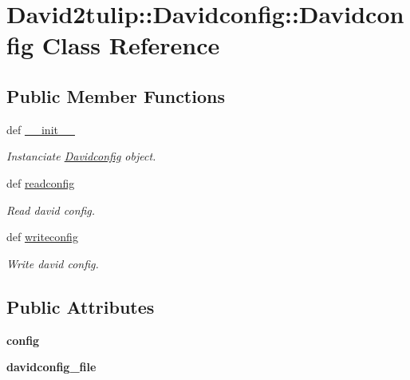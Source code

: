 \hypertarget{classDavid2tulip_1_1Davidconfig_1_1Davidconfig}{
\section{\-David2tulip\-:\-:\-Davidconfig\-:\-:\-Davidconfig \-Class \-Reference}
\label{classDavid2tulip_1_1Davidconfig_1_1Davidconfig}
}
\subsection*{\-Public \-Member \-Functions}
\begin{DoxyCompactItemize}
\item 
def \hyperlink{classDavid2tulip_1_1Davidconfig_1_1Davidconfig_ab54dbe407ba00db2ced4a7ff30ca144b}{\-\_\-\-\_\-init\-\_\-\-\_\-}
\begin{DoxyCompactList}\small\item\em \-Instanciate \hyperlink{classDavid2tulip_1_1Davidconfig_1_1Davidconfig}{\-Davidconfig} object. \end{DoxyCompactList}\item 
def \hyperlink{classDavid2tulip_1_1Davidconfig_1_1Davidconfig_ae745096fe43e4e5dfec64b0e6962d592}{readconfig}
\begin{DoxyCompactList}\small\item\em \-Read david config. \end{DoxyCompactList}\item 
\hypertarget{classDavid2tulip_1_1Davidconfig_1_1Davidconfig_a514860706e5ba33bc51ff2ce264c8379}{
def \hyperlink{classDavid2tulip_1_1Davidconfig_1_1Davidconfig_a514860706e5ba33bc51ff2ce264c8379}{writeconfig}}
\label{classDavid2tulip_1_1Davidconfig_1_1Davidconfig_a514860706e5ba33bc51ff2ce264c8379}

\begin{DoxyCompactList}\small\item\em \-Write david config. \end{DoxyCompactList}\end{DoxyCompactItemize}
\subsection*{\-Public \-Attributes}
\begin{DoxyCompactItemize}
\item 
\hypertarget{classDavid2tulip_1_1Davidconfig_1_1Davidconfig_aa4e893d6983301856a576deec9cc5990}{
{\bfseries config}}
\label{classDavid2tulip_1_1Davidconfig_1_1Davidconfig_aa4e893d6983301856a576deec9cc5990}

\item 
\hypertarget{classDavid2tulip_1_1Davidconfig_1_1Davidconfig_a7e840129d620ddfdb1ba69672bdafd67}{
{\bfseries davidconfig\-\_\-file}}
\label{classDavid2tulip_1_1Davidconfig_1_1Davidconfig_a7e840129d620ddfdb1ba69672bdafd67}

\end{DoxyCompactItemize}


